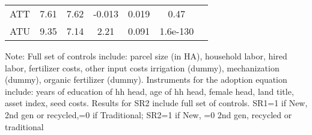 \begin{table}[H]
\begin{threeparttable}
\begin{tabular}{l cccccc}
ATT         &        7.61&        7.62&      -0.013&       0.019&        0.47\\
%
%
%
ATU         &        9.35&        7.14&        2.21&       0.091&    1.6e-130\\
\hline
\hline
\end{tabular}
\begin{tablenotes}
\footnotesize
\item{Note: Full set of controls include: parcel size (in HA), household labor, hired labor, fertilizer costs, other input costs irrigation (dummy), mechanization (dummy), organic fertilizer (dummy). Instruments for the adoption equation include: years of education of hh head, age of hh head, female head, land title, asset index, seed costs. Results for SR2 include full set of controls. SR1=1 if New, 2nd gen or recycled,=0 if Traditional; SR2=1 if New, =0 2nd gen, recycled or traditional}
\end{tablenotes}
\end{threeparttable}
\end{table}
